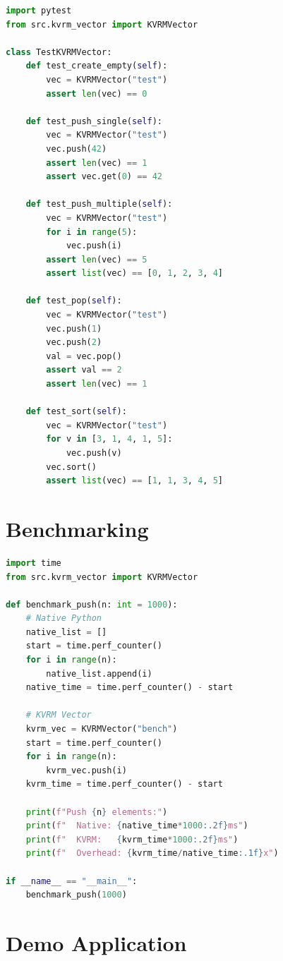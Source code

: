 \documentclass[11pt,a4paper]{article}
\begin{document}
\begin{lstlisting}[language=Python, caption={test\_kvrm\_vector.py}]
import pytest
from src.kvrm_vector import KVRMVector

class TestKVRMVector:
    def test_create_empty(self):
        vec = KVRMVector("test")
        assert len(vec) == 0

    def test_push_single(self):
        vec = KVRMVector("test")
        vec.push(42)
        assert len(vec) == 1
        assert vec.get(0) == 42

    def test_push_multiple(self):
        vec = KVRMVector("test")
        for i in range(5):
            vec.push(i)
        assert len(vec) == 5
        assert list(vec) == [0, 1, 2, 3, 4]

    def test_pop(self):
        vec = KVRMVector("test")
        vec.push(1)
        vec.push(2)
        val = vec.pop()
        assert val == 2
        assert len(vec) == 1

    def test_sort(self):
        vec = KVRMVector("test")
        for v in [3, 1, 4, 1, 5]:
            vec.push(v)
        vec.sort()
        assert list(vec) == [1, 1, 3, 4, 5]
\end{lstlisting}

\section{Benchmarking}

\begin{lstlisting}[language=Python, caption={benchmark\_vs\_native.py}]
import time
from src.kvrm_vector import KVRMVector

def benchmark_push(n: int = 1000):
    # Native Python
    native_list = []
    start = time.perf_counter()
    for i in range(n):
        native_list.append(i)
    native_time = time.perf_counter() - start

    # KVRM Vector
    kvrm_vec = KVRMVector("bench")
    start = time.perf_counter()
    for i in range(n):
        kvrm_vec.push(i)
    kvrm_time = time.perf_counter() - start

    print(f"Push {n} elements:")
    print(f"  Native: {native_time*1000:.2f}ms")
    print(f"  KVRM:   {kvrm_time*1000:.2f}ms")
    print(f"  Overhead: {kvrm_time/native_time:.1f}x")

if __name__ == "__main__":
    benchmark_push(1000)
\end{lstlisting}

\section{Demo Application}
\end{document}
